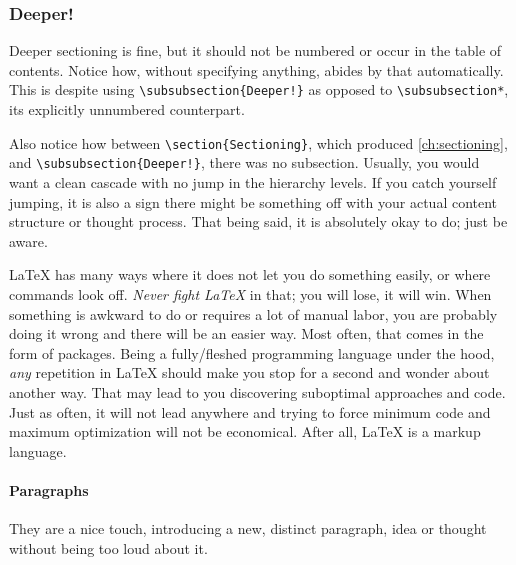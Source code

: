 \subsubsection{Deeper!}

Deeper sectioning is fine, but it should not be numbered or occur in the table of
contents.
Notice how, without specifying anything,  abides by that
automatically.
This is despite using \verb|\subsubsection{Deeper!}| as opposed to \verb|\subsubsection*|,
its explicitly unnumbered counterpart.

Also notice how between \verb|\section{Sectioning}|, which produced \cref{ch:sectioning},
and \verb|\subsubsection{Deeper!}|, there was no subsection.
Usually, you would want a clean cascade with no jump in the hierarchy levels.
If you catch yourself jumping, it is also a sign there might be something off with your
actual content structure or thought process.
That being said, it is absolutely okay to do; just be aware.

\LaTeX{} has many ways where it does not let you do something easily, or where
commands look off.
\emph{Never fight \LaTeX{}} in that; you will lose, it will win.
When something is awkward to do or requires a lot of manual labor, you are probably
doing it wrong and there will be an easier way.
Most often, that comes in the form of packages.
Being a fully\-/fleshed programming language under the hood, \emph{any} repetition
in \LaTeX{} should make you stop for a second and wonder about another way.
That may lead to you discovering suboptimal approaches and code.
Just as often, it will not lead anywhere and trying to force minimum code and
maximum optimization will not be economical.
After all, \LaTeX{} is a markup language.

\paragraph{Paragraphs}
They are a nice touch, introducing a new, distinct paragraph, idea or thought
without being too loud about it.

